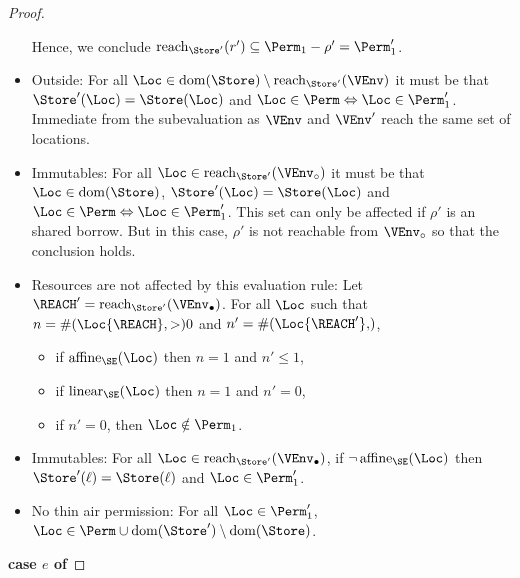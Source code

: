 \begin{proof}
\begin{itemize}
    Hence, we conclude  $\Reach{\Store'}{r'} \subseteq \Perm_1- \rho'
    = \Perm_1'$.
  \item Outside: For all $\Loc \in \Dom{\Store} \setminus
    \Reach{\Store'}{\VEnv}$ it must be that
    $\Store' (\Loc) = \Store (\Loc)$
    and $\Loc\in\Perm \Leftrightarrow \Loc\in\Perm_1'$. Immediate from
    the subevaluation as $\VEnv$ and $\VEnv'$ reach the same set of locations.
  \item Immutables: For all $\Loc \in
    \Reach{\Store'}{\ImmutableBorrows{\VEnv}}$ it must be that
    $\Loc\in\Dom\Store$,
    $\Store' (\Loc) = \Store (\Loc)$
    and $\Loc\in\Perm \Leftrightarrow \Loc\in\Perm_1'$.
    This set can only be affected if $\rho'$ is an shared
    borrow. But in this case, $\rho'$ is not reachable from
    $\ImmutableBorrows\VEnv$ so that the conclusion holds.
  \item Resources are not affected by this evaluation rule:
    Let $\REACH' =\Reach{\Store'}{\Active{\VEnv}}$.
    For all $\Loc$ such that $n= \MultiNumber\Loc{\REACH} >0$ and $n' =
    \MultiNumber\Loc{\REACH'}$,
    \begin{itemize}
    \item if $\Affine{\SE}\Loc$ then $n=1$ and $n'\le 1$,
    \item if $\Linear{\SE}\Loc$ then $n=1$ and $n' = 0$,
    \item if $n'=0$, then $\Loc\notin\Perm_1$.
    \end{itemize}
  \item Immutables: For all $\Loc \in \Reach
    {\Store'}{\Active{\VEnv}}$, if $\neg\Writeable{\SE}\Loc$ then
    $\Store' (\ell) = \Store (\ell)$ and $\Loc\in \Perm_1'$.
  \item No thin air permission: For all $\Loc\in \Perm_1'$, $\Loc
    \in \Perm \cup  \Dom{\Store'} \setminus \Dom{\Store}$.
  \end{itemize}
  \textbf{case $e$ of}


\end{proof}
